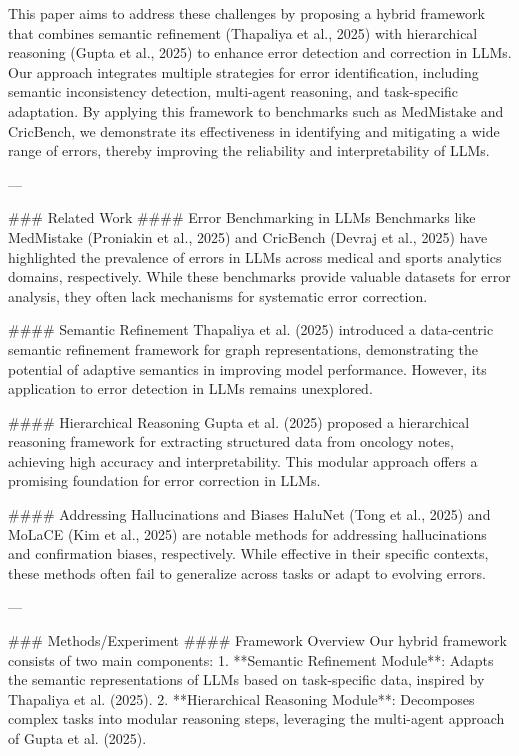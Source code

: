 This paper aims to address these challenges by proposing a hybrid framework that combines semantic refinement (Thapaliya et al., 2025) with hierarchical reasoning (Gupta et al., 2025) to enhance error detection and correction in LLMs. Our approach integrates multiple strategies for error identification, including semantic inconsistency detection, multi-agent reasoning, and task-specific adaptation. By applying this framework to benchmarks such as MedMistake and CricBench, we demonstrate its effectiveness in identifying and mitigating a wide range of errors, thereby improving the reliability and interpretability of LLMs.

---

### Related Work
#### Error Benchmarking in LLMs
Benchmarks like MedMistake (Proniakin et al., 2025) and CricBench (Devraj et al., 2025) have highlighted the prevalence of errors in LLMs across medical and sports analytics domains, respectively. While these benchmarks provide valuable datasets for error analysis, they often lack mechanisms for systematic error correction.

#### Semantic Refinement
Thapaliya et al. (2025) introduced a data-centric semantic refinement framework for graph representations, demonstrating the potential of adaptive semantics in improving model performance. However, its application to error detection in LLMs remains unexplored.

#### Hierarchical Reasoning
Gupta et al. (2025) proposed a hierarchical reasoning framework for extracting structured data from oncology notes, achieving high accuracy and interpretability. This modular approach offers a promising foundation for error correction in LLMs.

#### Addressing Hallucinations and Biases
HaluNet (Tong et al., 2025) and MoLaCE (Kim et al., 2025) are notable methods for addressing hallucinations and confirmation biases, respectively. While effective in their specific contexts, these methods often fail to generalize across tasks or adapt to evolving errors.

---

### Methods/Experiment
#### Framework Overview
Our hybrid framework consists of two main components:
1. **Semantic Refinement Module**: Adapts the semantic representations of LLMs based on task-specific data, inspired by Thapaliya et al. (2025).
2. **Hierarchical Reasoning Module**: Decomposes complex tasks into modular reasoning steps, leveraging the multi-agent approach of Gupta et al. (2025).

